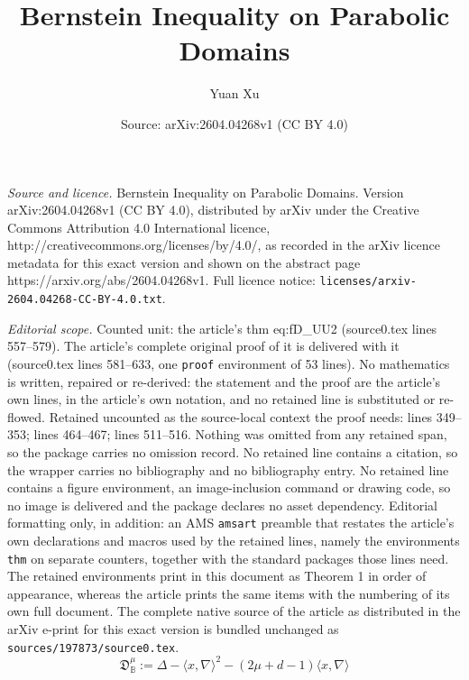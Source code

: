\documentclass[10pt,a4paper]{amsart}
\title{Bernstein Inequality on Parabolic Domains}
\author{Yuan Xu}
\date{Source: arXiv:2604.04268v1 (CC BY 4.0)}
\def\BB{{\mathbb B}}
\def\fD{{\mathfrak D}}
\def\la{{\langle}}
\def\ra{{\rangle}}
\begin{document}
\maketitle

\noindent\emph{Source and licence.} Bernstein Inequality on Parabolic Domains. Version arXiv:2604.04268v1 (CC BY 4.0), distributed by arXiv under the Creative Commons Attribution 4.0 International licence, http://creativecommons.org/licenses/by/4.0/, as recorded in the arXiv licence metadata for this exact version and shown on the abstract page https://arxiv.org/abs/2604.04268v1. Full licence notice: \texttt{licenses/arxiv-2604.04268-CC-BY-4.0.txt}.\par\smallskip

\noindent\textit{Editorial scope.} Counted unit: the article's thm eq:fD\_UU2 (source0.tex lines 557--579). The article's complete original proof of it is delivered with it (source0.tex lines 581--633, one \texttt{proof} environment of 53 lines). No mathematics is written, repaired or re-derived: the statement and the proof are the article's own lines, in the article's own notation, and no retained line is substituted or re-flowed.  Retained uncounted as the source-local context the proof needs: lines 349--353; lines 464--467; lines 511--516.  Nothing was omitted from any retained span, so the package carries no omission record.  No retained line contains a citation, so the wrapper carries no bibliography and no bibliography entry.  No retained line contains a figure environment, an image-inclusion command or drawing code, so no image is delivered and the package declares no asset dependency.  Editorial formatting only, in addition: an AMS \texttt{amsart} preamble that restates the article's own declarations and macros used by the retained lines, namely the environments \texttt{thm} on separate counters, together with the standard packages those lines need.  The retained environments print in this document as Theorem 1 in order of appearance, whereas the article prints the same items with the numbering of its own full document.  The complete native source of the article as distributed in the arXiv e-print for this exact version is bundled unchanged as \texttt{sources/197873/source0.tex}.
\begin{equation} \label{eq:fD_Bd}
  \fD_\BB^\mu:= \Delta - \la x, \nabla \ra^2 - (2\mu + d-1) \la x, \nabla \ra 
\end{equation}
\end{document}
